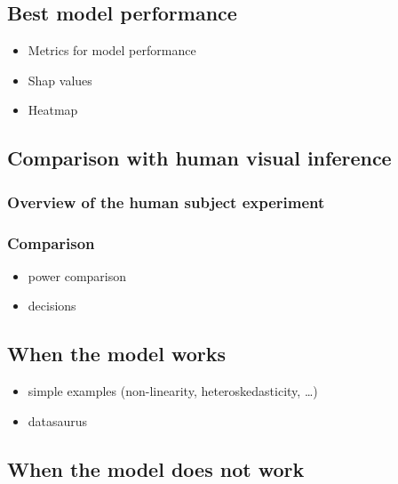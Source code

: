 \documentclass[]{interact}
\theoremstyle{plain}%
\theoremstyle{definition}
\theoremstyle{remark}
\providecommand{\tightlist}{%
  \setlength{\itemsep}{0pt}\setlength{\parskip}{0pt}}
\def\tightlist{}
\begin{document}
\hypertarget{best-model-performance}{%
\subsection{Best model performance}\label{best-model-performance}}

\begin{itemize}
\tightlist
\item
  Metrics for model performance
\item
  Shap values
\item
  Heatmap
\end{itemize}

\hypertarget{comparison-with-human-visual-inference}{%
\subsection{Comparison with human visual
inference}\label{comparison-with-human-visual-inference}}

\hypertarget{overview-of-the-human-subject-experiment}{%
\subsubsection{Overview of the human subject
experiment}\label{overview-of-the-human-subject-experiment}}

\hypertarget{comparison}{%
\subsubsection{Comparison}\label{comparison}}

\begin{itemize}
\tightlist
\item
  power comparison
\item
  decisions
\end{itemize}

\hypertarget{when-the-model-works}{%
\subsection{When the model works}\label{when-the-model-works}}

\begin{itemize}
\tightlist
\item
  simple examples (non-linearity, heteroskedasticity, \ldots)
\item
  datasaurus
\end{itemize}

\hypertarget{when-the-model-does-not-work}{%
\subsection{When the model does not
work}\label{when-the-model-does-not-work}}
\end{document}
